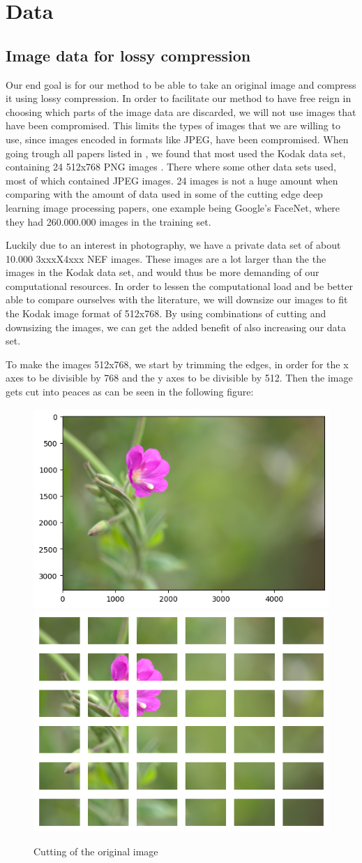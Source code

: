 \chapter{Data}
\section{Image data for lossy compression}
Our end goal is for our method to be able to take an original image and compress it using lossy compression. In order to facilitate our method to have free reign in choosing which parts of the image data are discarded, we will not use images that have been compromised. This limits the types of images that we are willing to use, since images encoded in formats like JPEG, have been compromised. When going trough all papers listed in \cite{benchmark}, we found that most used the Kodak data set, containing 24 512x768 PNG images \cite{Kodak}. There where some other data sets used, most of which contained JPEG images. 24 images is not a huge amount when comparing with the amount of data used in some of the cutting edge deep learning image processing papers, one example being Google's FaceNet, where they had 260.000.000 images in the training set\cite{FaceNet}. 

Luckily due to an interest in photography, we have a private data set of about 10.000 3xxxX4xxx NEF images. These images are a lot larger than the the images in the Kodak data set, and would thus be more demanding of our computational resources. In order to lessen the computational load and be better able to compare ourselves with the literature, we will downsize our images to fit the Kodak image format of 512x768. By using combinations of cutting and downsizing the images, we can get the added benefit of also increasing our data set.

To make the images 512x768, we start by trimming the edges, in order for the x axes to be divisible by 768 and the y axes to be divisible by 512. Then the image gets cut into peaces as can be seen in the following figure:
\begin{figure}[H]
    \centering
    \includegraphics[width=0.45\linewidth,origin=c]{Report/Pictures/data/Original_img.png}
    \includegraphics[width=0.45\linewidth,origin=c]{Report/Pictures/data/Split_img.png}
    \caption{Cutting of the original image}
\end{figure}

